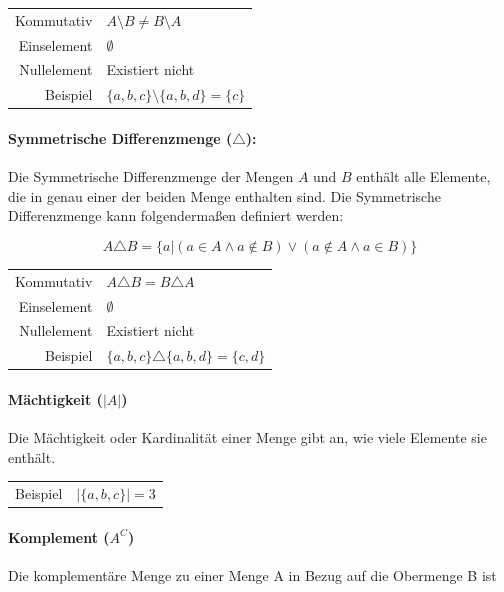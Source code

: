 \documentclass[../main.tex]{subfiles}
\begin{document}
                    \begin{tabular}{ r l }
						Kommutativ & $A \setminus B \not = B \setminus A$ \\
						Einselement & $\emptyset$ \\
						Nullelement & Existiert nicht \\
                    	Beispiel & $\{a, b, c\} \setminus \{a, b, d\} = \{c\}$
					\end{tabular}
                    
                \paragraph{Symmetrische Differenzmenge ($\triangle$):}
                    Die Symmetrische Differenzmenge der Mengen $A$ und $B$ enthält alle Elemente, die in genau einer der beiden Menge enthalten sind. Die Symmetrische Differenzmenge kann folgendermaßen definiert werden:
                    
                    \begin{equation}
                        A \triangle B = \{a | \left(a \in A \wedge a \notin B\right) \vee \left(a \notin A \wedge a \in B\right)\}
                    \end{equation}
                    
                    \begin{tabular}{ r l }
						Kommutativ & $A \triangle B = B \triangle A$ \\
						Einselement & $\emptyset$ \\
						Nullelement & Existiert nicht \\
                    	Beispiel & $\{a, b, c\} \triangle \{a, b, d\} = \{c, d\}$
					\end{tabular}
                    
                \paragraph{Mächtigkeit ($|A|$)}
                    Die Mächtigkeit oder Kardinalität einer Menge gibt an, wie viele Elemente sie enthält.
                    
                    \begin{tabular}{ r l }
                    	Beispiel & $|\{a, b, c\}| = 3$
					\end{tabular}
                    
                \paragraph{Komplement ($A^C$)}
                    Die komplementäre Menge zu einer Menge A in Bezug auf die Obermenge B ist
                    
\end{document}
